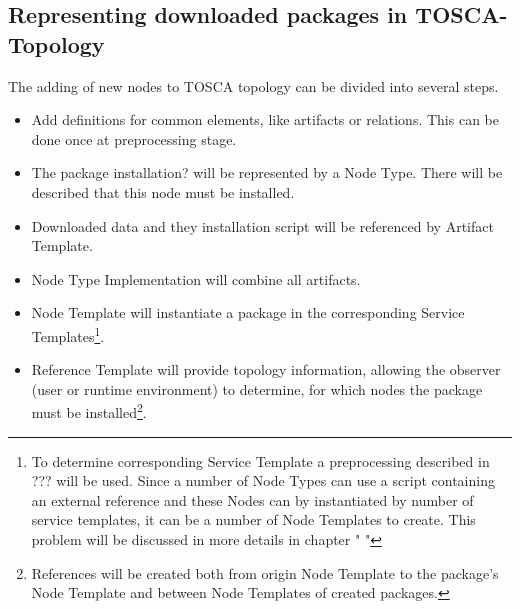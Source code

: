 \subsection{Representing downloaded packages in TOSCA-Topology}
The adding of new nodes to TOSCA topology can be divided into several steps.
\begin{itemize}
	\item Add definitions for common elements, like artifacts or relations. This can be done once at preprocessing stage.
	\item The package installation? will be represented by a Node Type. There will be described that this node must be installed.
	\item Downloaded data and they installation script will be referenced by Artifact Template.
	\item Node Type Implementation will combine all artifacts.
	\item Node Template will instantiate a package in the corresponding Service Templates\footnote{\label{fussnote}
		To determine corresponding Service Template a preprocessing described in ??? will be used.
		Since a number of Node Types can use a script containing an external reference and these Nodes can by instantiated by number of service templates, it can be a number of Node Templates to create. This problem will be discussed in more details in chapter " "}.
	\item Reference Template will provide topology information, allowing the observer (user or runtime environment) to determine, for which nodes the package must be installed\footnote{\label{fussnote}
		References will be created both from origin Node Template to the package's Node Template and between Node Templates of created packages.}.
\end{itemize}
